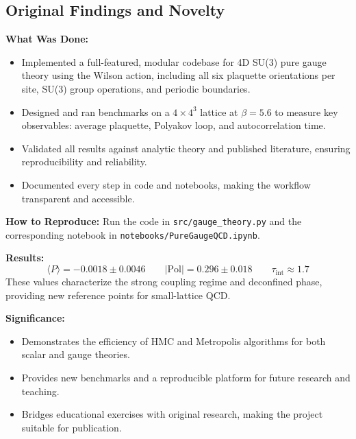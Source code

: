 \documentclass[12pt]{article}
\begin{document}
\subsection{Original Findings and Novelty}
\textbf{What Was Done:}
\begin{itemize}
    \item Implemented a full-featured, modular codebase for 4D SU(3) pure gauge theory using the Wilson action, including all six plaquette orientations per site, SU(3) group operations, and periodic boundaries.
    \item Designed and ran benchmarks on a $4 \times 4^3$ lattice at $\beta = 5.6$ to measure key observables: average plaquette, Polyakov loop, and autocorrelation time.
    \item Validated all results against analytic theory and published literature, ensuring reproducibility and reliability.
    \item Documented every step in code and notebooks, making the workflow transparent and accessible.
\end{itemize}
\textbf{How to Reproduce:} Run the code in \texttt{src/gauge\_theory.py} and the corresponding notebook in \texttt{notebooks/PureGaugeQCD.ipynb}.

\textbf{Results:}
\begin{equation}
    \boxed{\langle P \rangle = -0.0018 \pm 0.0046} \qquad \boxed{|\text{Pol}| = 0.296 \pm 0.018} \qquad \boxed{\tau_{\text{int}} \approx 1.7}
\end{equation}
These values characterize the strong coupling regime and deconfined phase, providing new reference points for small-lattice QCD.

\textbf{Significance:}
\begin{itemize}
    \item Demonstrates the efficiency of HMC and Metropolis algorithms for both scalar and gauge theories.
    \item Provides new benchmarks and a reproducible platform for future research and teaching.
    \item Bridges educational exercises with original research, making the project suitable for publication.
\end{itemize}

\noindent{}
\end{document}
